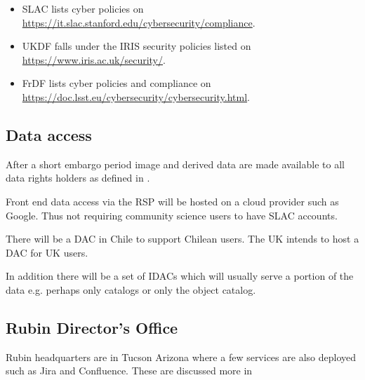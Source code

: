\begin{itemize}
\item SLAC lists cyber policies on \url{https://it.slac.stanford.edu/cybersecurity/compliance}.
\item UKDF falls under the \gls{IRIS} security policies listed on \url{https://www.iris.ac.uk/security/}.
\item FrDF lists cyber policies and compliance on \url{https://doc.lsst.eu/cybersecurity/cybersecurity.html}.
\end{itemize}



\subsection{Data access}
After a short embargo period image and derived data are made available to all
data rights holders as defined in .

Front end data access via the \gls{RSP} will be hosted on a \gls{cloud} provider such as Google.
Thus not requiring community science users to have \gls{SLAC} accounts.

There will  be a \gls{DAC} in Chile to support Chilean users.
The \gls{UK} intends to host a DAC for \gls{UK} users.

In addition there will be a set of \gls{IDAC}s which will usually serve a portion of the data e.g. perhaps only catalogs or only the object catalog.


\subsection{Rubin \gls{Director}'s Office}
Rubin headquarters are in Tucson Arizona where a few services are also deployed such as Jira and Confluence.
These are discussed more in 

